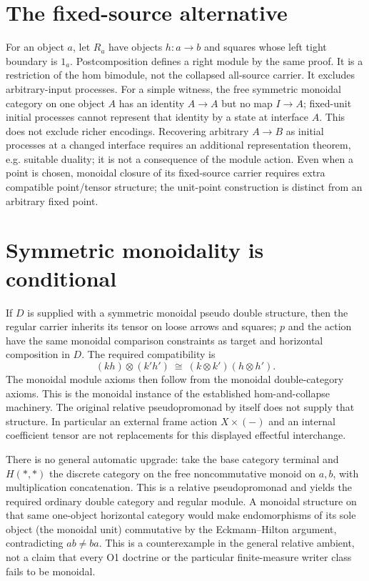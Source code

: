\documentclass{article}
\begin{document}
\section{The fixed-source alternative}
For an object $a$, let $R_a$ have objects $h:a\to b$ and squares whose left tight boundary is $1_a$. Postcomposition defines a right module by the same proof. It is a restriction of the hom bimodule, not the collapsed all-source carrier. It excludes arbitrary-input processes. For a simple witness, the free symmetric monoidal category on one object $A$ has an identity $A\to A$ but no map $I\to A$; fixed-unit initial processes cannot represent that identity by a state at interface $A$. This does not exclude richer encodings. Recovering arbitrary $A\to B$ as initial processes at a changed interface requires an additional representation theorem, e.g. suitable duality; it is not a consequence of the module action. Even when a point is chosen, monoidal closure of its fixed-source carrier requires extra compatible point/tensor structure; the unit-point construction is distinct from an arbitrary fixed point.

\section{Symmetric monoidality is conditional}
If $D$ is supplied with a symmetric monoidal pseudo double structure, then the regular carrier inherits its tensor on loose arrows and squares; $p$ and the action have the same monoidal comparison constraints as target and horizontal composition in $D$. The required compatibility is
\[(kh)\otimes(k'h')\ \cong\ (k\otimes k')(h\otimes h').\]
The monoidal module axioms then follow from the monoidal double-category axioms. This is the monoidal instance of the established hom-and-collapse machinery. The original relative pseudopromonad by itself does not supply that structure. In particular an external frame action $X\times(-)$ and an internal coefficient tensor are not replacements for this displayed effectful interchange.

There is no general automatic upgrade: take the base category terminal and $H(*,*)$ the discrete category on the free noncommutative monoid on $a,b$, with multiplication concatenation. This is a relative pseudopromonad and yields the required ordinary double category and regular module. A monoidal structure on that same one-object horizontal category would make endomorphisms of its sole object (the monoidal unit) commutative by the Eckmann--Hilton argument, contradicting $ab\ne ba$. This is a counterexample in the general relative ambient, not a claim that every O1 doctrine or the particular finite-measure writer class fails to be monoidal.
\end{document}
